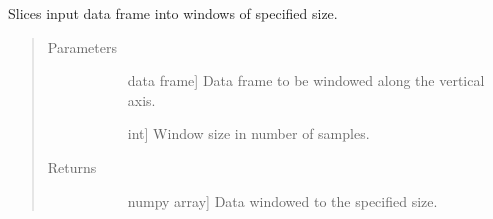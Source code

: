 \documentclass[letterpaper,10pt,english]{sphinxmanual}
\begin{document}
\begin{fulllineitems}
\label{\detokenize{index:sleeppy.utils.non_overlapping_windows}}
Slices input data frame into windows of specified size.
\begin{quote}\begin{description}
\item[{Parameters}] \leavevmode\begin{description}
\item[{}] \leavevmode{[}data frame{]}
Data frame to be windowed along the vertical axis.

\item[{}] \leavevmode{[}int{]}
Window size in number of samples.

\end{description}

\item[{Returns}] \leavevmode\begin{description}
\item[{}] \leavevmode{[}numpy array{]}
Data windowed to the specified size.

\end{description}

\end{description}\end{quote}

\end{fulllineitems}

\end{document}
